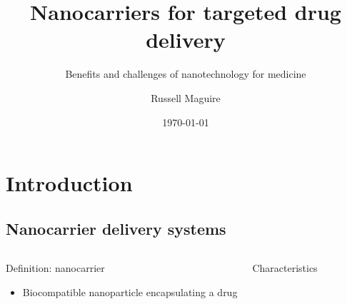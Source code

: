\documentclass[aspectratio=169,compress]{beamer}
\author{Russell Maguire}
\title{Nanocarriers for targeted drug delivery}
\subtitle{Benefits and challenges of nanotechnology for medicine}
\institute{ENGI4131 Advanced Semiconductor Devices \and Durham University}
\date{\today}
\begin{document}
\frame{\titlepage}


\section{Introduction}

\subsection{Nanocarrier delivery systems}
\begin{frame}{\subsecname}
  \begin{columns}
      \begin{block}{Definition: nanocarrier}
        \begin{itemize}
          \item Biocompatible nanoparticle encapsulating a drug
        \end{itemize}
      \end{block}

      \begin{block}{Characteristics}
      \end{block}

  \end{columns}
\end{frame}
\end{document}
